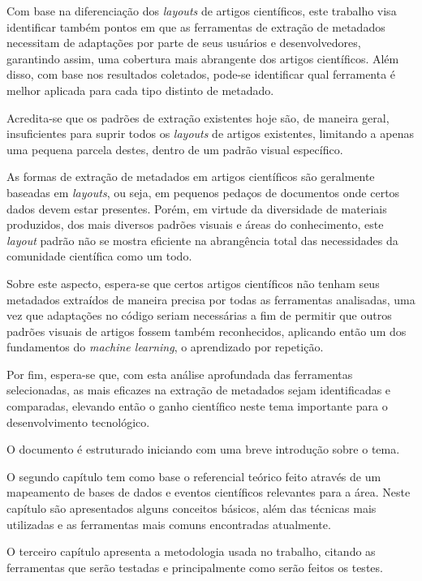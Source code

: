 Com base na diferenciação dos \textit{layouts} de artigos científicos, este trabalho visa identificar também pontos em que as ferramentas de extração de metadados necessitam de adaptações por parte de seus usuários e desenvolvedores, garantindo assim, uma cobertura mais abrangente dos artigos científicos. Além disso, com base nos resultados coletados, pode-se identificar qual ferramenta é melhor aplicada para cada tipo distinto de metadado.

Acredita-se que os padrões de extração existentes hoje são, de maneira geral, insuficientes para suprir todos os \emph{layouts} de artigos existentes, limitando a apenas uma pequena parcela destes, dentro de um padrão visual específico.

As formas de extração de metadados em artigos científicos são geralmente baseadas em \textit{layouts}, ou seja, em pequenos pedaços de documentos onde certos dados devem estar presentes. Porém, em virtude da diversidade de materiais produzidos, dos mais diversos padrões visuais e áreas do conhecimento, este \textit{layout} padrão não se mostra eficiente na abrangência total das necessidades da comunidade científica como um todo. 

Sobre este aspecto, espera-se que certos artigos científicos não tenham seus metadados extraídos de maneira precisa por todas as ferramentas analisadas, uma vez que adaptações no código seriam necessárias a fim de permitir que outros padrões visuais de artigos fossem também reconhecidos, aplicando então um dos fundamentos do \textit{machine learning}, o aprendizado por repetição. 

Por fim, espera-se que, com esta análise aprofundada das ferramentas selecionadas, as mais eficazes na extração de metadados sejam identificadas e comparadas, elevando então o ganho científico neste tema importante para o desenvolvimento tecnológico.

O documento é estruturado iniciando com uma breve introdução sobre o tema.

O segundo capítulo tem como base o referencial teórico feito através de um mapeamento de bases de dados e eventos científicos relevantes para a área. Neste capítulo são apresentados alguns conceitos básicos, além das técnicas mais utilizadas e as ferramentas mais comuns encontradas atualmente.

O terceiro capítulo apresenta a metodologia usada no trabalho, citando as ferramentas que serão testadas e principalmente como serão feitos os testes. 

